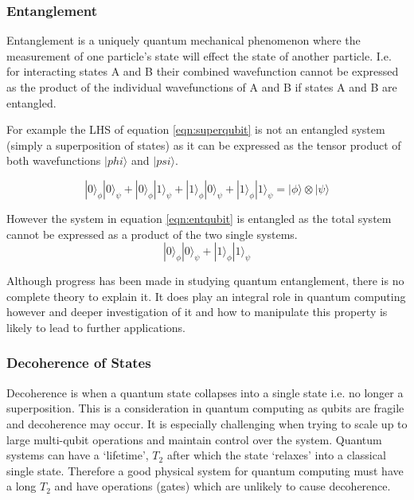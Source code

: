 \subsubsection{Entanglement}
Entanglement is a uniquely quantum mechanical phenomenon where the measurement of one particle's state will effect the state of another particle.
I.e. for interacting states A and B their combined wavefunction cannot be expressed as the product of the individual wavefunctions of A and B if states A and B are entangled. \cite{bransden_quantum_2000}

For example the LHS of equation \ref{eqn:superqubit} is not an entangled system (simply a superposition of states) as it can be expressed as the tensor product of both wavefunctions $|phi\rangle$ and $|psi\rangle$.

\begin{equation}\label{eqn:superqubit}
    |0\rangle_\phi|0\rangle_\psi + |0\rangle_\phi|1\rangle_\psi + |1\rangle_\phi|0\rangle_\psi +
    |1\rangle_\phi|1\rangle_\psi = |\phi\rangle \otimes |\psi\rangle
\end{equation}

However the system in equation \ref{eqn:entqubit} is entangled as the total system cannot be expressed as a product of the two single systems. 
\begin{equation}\label{eqn:entqubit}
    |0\rangle_\phi|0\rangle_\psi + 
    |1\rangle_\phi|1\rangle_\psi
\end{equation}



Although progress has been made in studying quantum entanglement, there is no complete theory to explain it. 
It does play an integral role in quantum computing however and deeper investigation of it and how to manipulate this property is likely to lead to further applications. \cite{nielsen_quantum_2010}



\subsubsection{Decoherence of States}
Decoherence is when a quantum state collapses into a single state i.e. no longer a superposition.
This is a consideration in quantum computing as qubits are fragile and decoherence may occur.
It is especially challenging when trying to scale up to large multi-qubit operations and maintain control over the system. \cite{zhang_observation_2017}
Quantum systems can have a `lifetime', $T_2$ after which the state `relaxes' into a classical single state. 
Therefore a good physical system for quantum computing must have a long $T_2$ and have operations (gates) which are unlikely to cause decoherence. \cite{nielsen_quantum_2010}



